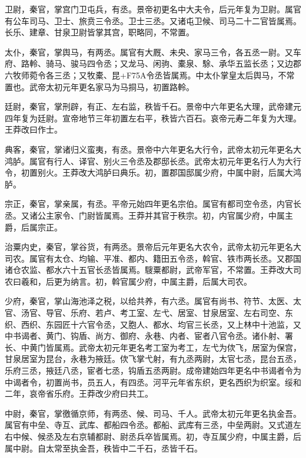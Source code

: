 \documentclass[12pt,UTF8]{ctexbook}
\begin{document}
卫尉，秦官，掌宫门卫屯兵，有丞。景帝初更名中大夫令，后元年复为卫尉。属官有公车司马、卫士、旅贲三令丞。卫士三丞。又诸屯卫候、司马二十二官皆属焉。长乐、建章、甘泉卫尉皆掌其宫，职略同，不常置。



太仆，秦官，掌舆马，有两丞。属官有大厩、未央、家马三令，各五丞一尉。又车府、路軨、骑马、骏马四令丞；又龙马、闲驹、橐泉、駼、承华五监长丞；又边郡六牧师菀令各三丞；又牧橐、昆+F75A令丞皆属焉。中太仆掌皇太后舆马，不常置也。武帝太初元年更名家马为马挏马，初置路軨。



廷尉，秦官，掌刑辟，有正、左右监，秩皆千石。景帝中六年更名大理，武帝建元四年复为廷尉。宣帝地节三年初置左右平，秩皆六百石。哀帝元寿二年复为大理。王莽改曰作士。



典客，秦官，掌诸归义蛮夷，有丞。景帝中六年更名大行令，武帝太初元年更名大鸿胪。属官有行人、译官、别火三令丞及郡邸长丞。武帝太初元年更名行人为大行令，初置别火。王莽改大鸿胪曰典乐。初，置郡国邸属少府，中属中尉，后属大鸿胪。



宗正，秦官，掌亲属，有丞。平帝元始四年更名宗伯。属官有都司空令丞，内官长丞。又诸公主家令、门尉皆属焉。王莽并其官于秩宗。初，内官属少府，中属主爵，后属宗正。



治粟内史，秦官，掌谷货，有两丞。景帝后元年更名大农令，武帝太初元年更名大司农。属官有太仓、均输、平准、都内、籍田五令丞，斡官、铁市两长丞。又郡国诸仓农监、都水六十五官长丞皆属焉。騪粟都尉，武帝军官，不常置。王莽改大司农曰羲和，后更为纳言。初，斡官属少府，中属主爵，后属大司农。



少府，秦官，掌山海池泽之税，以给共养，有六丞。属官有尚书、符节、太医、太官、汤官、导官、乐府、若卢、考工室、左弋、居室、甘泉居室、左右司空、东织、西织、东园匠十六官令丞，又胞人、都水、均官三长丞，又上林中十池监，又中书谒者、黄门、钩盾、尚方、御府、永巷、内者、宦者八官令丞。诸仆射、署长、中黄门皆属焉。武帝太初元年更名考工室为考工，左弋为佽飞，居室为保宫，甘泉居室为昆台，永巷为掖廷。佽飞掌弋射，有九丞两尉，太官七丞，昆台五丞，乐府三丞，掖廷八丞，宦者七丞，钩盾五丞两尉。成帝建始四年更名中书谒者令为中谒者令，初置尚书，员五人，有四丞。河平元年省东织，更名西织为织室。绥和二年，哀帝省乐府。王莽改少府曰共工。



中尉，秦官，掌徼循京师，有两丞、候、司马、千人。武帝太初元年更名执金吾。属官有中垒、寺互、武库、都船四令丞。都船、武库有三丞，中垒两尉。又式道左右中候、候丞及左右京辅都尉、尉丞兵卒皆属焉。初，寺互属少府，中属主爵，后属中尉。自太常至执金吾，秩皆中二千石，丞皆千石。
\end{document}
